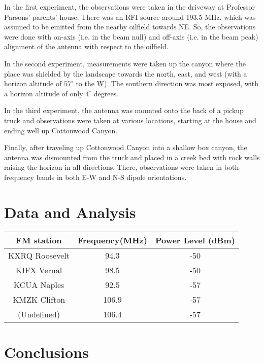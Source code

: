 \documentclass[11pt]{article}
\begin{document}
In the first experiment, the observations were taken in the driveway at 
Professor Parsons' parents' house. There was an RFI source around 193.5 MHz, 
which was assumed to be emitted from the nearby oilfield towards NE. So, the 
observations were done with on-axis (i.e. in the beam null) and off-axis (i.e.  
in the beam peak) alignment of the antenna with respect to the oilfield.

In the second experiment, measurements were taken up the canyon where the
place was shielded by the landscape towards the north, east, and west (with a 
horizon altitude of $57^{\circ}$ to the W). The southern direction was most 
exposed, with a horizon altitude of only $4^{\circ}$ degrees.

In the third experiment, the antenna was mounted onto the back of a pickup 
truck and observations were taken at various locations, starting at the house 
and ending well up Cottonwood Canyon.

Finally, after traveling up Cottonwood Canyon into a shallow box canyon, the 
antenna was dismounted from the truck and placed in a creek bed with rock walls 
raising the horizon in all directions. There, observations were taken in both 
frequency bands in both E-W and N-S dipole orientations.

\section{Data and Analysis}

\begin{center}
 \begin{tabular}{ |c|c|c| }
  \hline
  FM station  & Frequency(MHz) & Power Level (dBm) \\
  \hline
  KXRQ Roosevelt & 94.3 & -50 \\
  \hline
  KIFX Vernal  & 98.5 & -50 \\
  \hline
  KCUA Naples  & 92.5 & -57 \\
  \hline
  KMZK Clifton & 106.9  &-57 \\
  \hline
  (Undefined)  & 106.4 & -57 \\
  \hline
  \end{tabular}
  \label{tab:rfi-sources}
\end{center}



\section{Conclusions}
\end{document}
